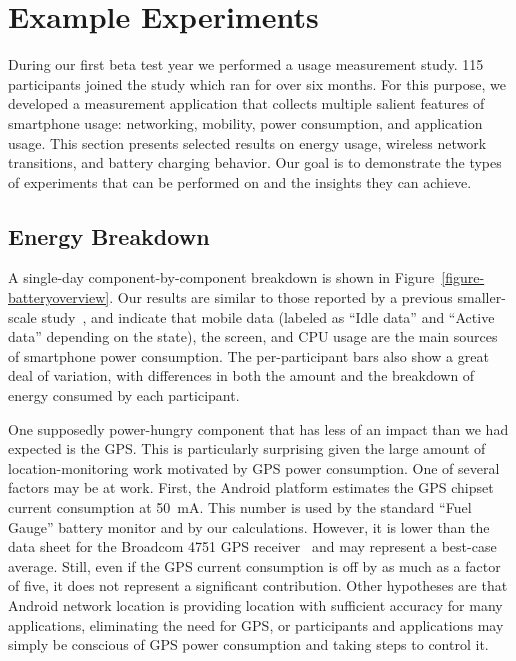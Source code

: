 \section{Example Experiments}
\label{sec-experiments}

During our first beta test year we performed a usage measurement study. 115
participants joined the study which ran for over six months. For this
purpose, we developed a measurement application that collects multiple
salient features of smartphone usage: networking, mobility, power
consumption, and application usage. This section presents selected results on
energy usage, wireless network transitions, and battery charging behavior.
Our goal is to demonstrate the types of experiments that can be performed on
\PhoneLab{} and the insights they can achieve.

\subsection{Energy Breakdown}
\label{subsec-energybreakdown}

A single-day component-by-component breakdown is shown in
Figure~\ref{figure-batteryoverview}. Our results are similar to those reported
by a previous smaller-scale study~\cite{shye:micro:2009}, and indicate that
mobile data (labeled as ``Idle data'' and ``Active data'' depending on the
state), the screen, and CPU usage are the main sources of smartphone power
consumption. The per-participant bars also show a great deal of variation, with
differences in both the amount and the breakdown of energy consumed by each
participant.

One supposedly power-hungry component that has less of an impact than we had
expected is the GPS. This is particularly surprising given the large amount
of location-monitoring work motivated by GPS power consumption. One of
several factors may be at work. First, the Android platform estimates the GPS
chipset current consumption at 50~mA. This number is used by the standard
``Fuel Gauge'' battery monitor and by our calculations. However, it is lower
than the data sheet for the Broadcom 4751 GPS receiver~\cite{bcm4751} and may
represent a best-case average. Still, even if the GPS current consumption is
off by as much as a factor of five, it does not represent a significant
contribution. Other hypotheses are that Android network location is providing
location with sufficient accuracy for many applications, eliminating the need
for GPS, or participants and applications may simply be conscious of GPS
power consumption and taking steps to control it.

